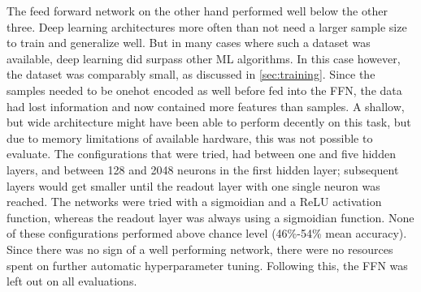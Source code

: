 The feed forward network on the other hand performed well below the other three. Deep learning architectures more often than not need a larger sample size to train and generalize well. But in many cases where such a dataset was available, deep learning did surpass other ML algorithms. In this case however, the dataset was comparably small, as discussed in \ref{sec:training}. Since the samples needed to be onehot encoded as well before fed into the FFN, the data had lost information and now contained more features than samples. A shallow, but wide architecture might have been able to perform decently on this task, but due to memory limitations of available hardware, this was not possible to evaluate. The configurations that were tried, had between one and five hidden layers, and between 128 and 2048 neurons in the first hidden layer; subsequent layers would get smaller until the readout layer with one single neuron was reached. The networks were tried with a sigmoidian and a ReLU activation function, whereas the readout layer was always using a sigmoidian function. None of these configurations performed above chance level (46\%-54\% mean accuracy). Since there was no sign of a well performing network, there were no resources spent on further automatic hyperparameter tuning. Following this, the FFN was left out on all evaluations.

